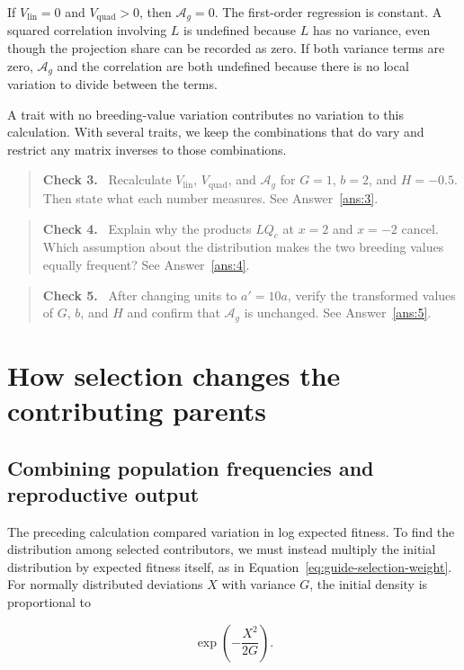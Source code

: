 \documentclass[11pt]{article}
\newcommand{\Ag}{\ensuremath{\mathcal A_g}}
\newcommand{\Vlin}{\ensuremath{V_{\mathrm{lin}}}}
\newcommand{\Vquad}{\ensuremath{V_{\mathrm{quad}}}}
\newenvironment{checkpoint}[1]
  {\begin{quote}\small\noindent\textbf{Check #1.}\ }
  {\end{quote}}
\begin{document}
If $\Vlin=0$ and $\Vquad>0$, then $\Ag=0$.  The first-order regression is
constant.  A squared correlation involving $L$ is undefined because $L$ has
no variance, even though the projection share can be recorded as zero.  If
both variance terms are zero, \Ag{} and the correlation are both undefined
because there is no local variation to divide between the terms.

A trait with no breeding-value variation contributes no variation to this calculation. With several traits, we keep the combinations that do vary and restrict any matrix inverses to those combinations.

\begin{checkpoint}{3}
Recalculate $\Vlin$, $\Vquad$, and \Ag{} for $G=1$, $b=2$, and $H=-0.5$.
Then state what each number measures.  See Answer~\ref{ans:3}.
\end{checkpoint}

\begin{checkpoint}{4}
Explain why the products $LQ_c$ at $x=2$ and $x=-2$ cancel.  Which assumption
about the distribution makes the two breeding values equally frequent?  See
Answer~\ref{ans:4}.
\end{checkpoint}

\begin{checkpoint}{5}
After changing units to $a'=10a$, verify the transformed values of $G$, $b$,
and $H$ and confirm that \Ag{} is unchanged.  See Answer~\ref{ans:5}.
\end{checkpoint}

\section{How selection changes the contributing parents}
\label{sec:s2}

\subsection{Combining population frequencies and reproductive output}

The preceding calculation compared variation in log expected fitness. To find the distribution among selected contributors, we must instead multiply the initial distribution by expected fitness itself, as in Equation~\eqref{eq:guide-selection-weight}. For normally distributed deviations $X$ with variance $G$, the initial density is proportional to

\begin{equation}
\exp\left(-\frac{X^2}{2G}\right).
\end{equation}
\end{document}
